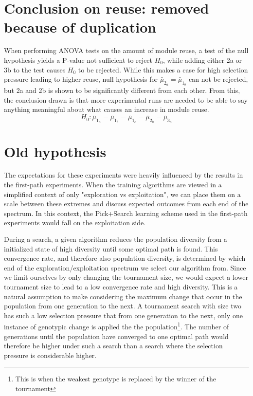 \chapter{Conclusion on reuse: removed because of duplication}
When performing ANOVA tests on the amount of module reuse, a test of the null hypothesis yields a P-value not sufficient to reject \(H_{0}\), while adding either 2a or 3b to the test causes \(H_{0}\) to be rejected. While this makes a case for high selection pressure leading to higher reuse, null hypothesis for \(\bar{\mu}_{2_{a}}=\bar{\mu}_{1_{b}}\) can not be rejected, but 2a and 2b is shown to be significantly different from each other. From this, the conclusion drawn is that more experimental runs are needed to be able to say anything meaningful about what causes an increase in module reuse.
\begin{equation*}
    H_{0}:\bar{\mu}_{1_{a}}=\bar{\mu}_{1_{b}}=\bar{\mu}_{1_{c}}=\bar{\mu}_{2_{b}}=\bar{\mu}_{3_{a}}
\end{equation*}
\chapter{Old hypothesis}
The expectations for these experiments were heavily influenced by the results in the first-path experiments. When the training algorithms are viewed in a simplified context of only "exploration vs exploitation", we can place them on a scale between these extremes and discuss expected outcomes from each end of the spectrum. In this context, the Pick+Search learning scheme used in the first-path experiments would fall on the exploitation side.

During a search, a given algorithm reduces the population diversity from a initialized state of high diversity until some optimal path is found. This convergence rate, and therefore also population diversity, is determined by which end of the exploration/exploitation spectrum we select our algorithm from. Since we limit ourselves by only changing the tournament size, we would expect a lower tournament size to lead to a low convergence rate and high diversity. This is a natural assumption to make considering the maximum change that occur in the population from one generation to the next. A tournament search with size two has such a low selection pressure that from one generation to the next, only one instance of genotypic change is applied the the population\footnote{This is when the weakest genotype is replaced by the winner of the tournament}. The number of generations until the population have converged to one optimal path would therefore be higher under such a search than a search where the selection pressure is considerable higher. 

